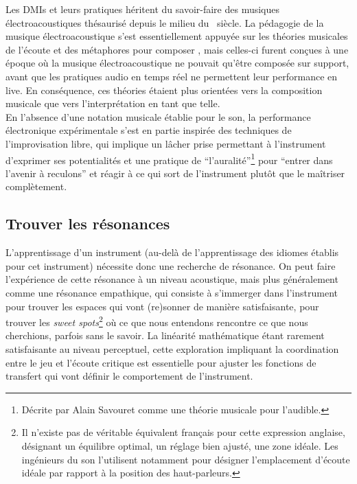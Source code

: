 \noindent Les \glspl{DMI} et leurs pratiques héritent du savoir-faire des musiques électroacoustiques thésaurisé depuis le milieu du ~siècle. La pédagogie de la musique électroacoustique s'est essentiellement appuyée sur les théories musicales de l'écoute \cite{schaeffer_traite_1966} et des métaphores pour composer \cite{bayle_musique_1993}, mais celles-ci furent conçues à une époque où la musique électroacoustique ne pouvait qu'être composée sur support, avant que les pratiques audio en temps réel ne permettent leur performance en live. En conséquence, ces théories étaient plus orientées vers la composition musicale que vers l'interprétation en tant que telle.\\
\indent En l'absence d'une notation musicale établie pour le son, la performance électronique expérimentale s'est en partie inspirée des techniques de l'improvisation libre, qui implique un lâcher prise permettant à l'instrument d'exprimer ses potentialités et une pratique de ``l'auralité''\footnote{Décrite par Alain Savouret comme une théorie musicale pour l'audible.} pour ``entrer dans l'avenir à reculons'' \cite{savouret_introduction_2010} et réagir à ce qui sort de l'instrument plutôt que le maîtriser complètement. 

\subsection{Trouver les résonances}

\noindent L'apprentissage d'un instrument (au-delà de l'apprentissage des idiomes établis pour cet instrument) nécessite donc une recherche de résonance. On peut faire l'expérience de cette résonance à un niveau acoustique, mais plus généralement comme une résonance empathique, qui consiste à s'immerger dans l'instrument pour trouver les espaces qui vont (re)sonner de manière satisfaisante, pour trouver les \textit{sweet spots}\footnote{Il n'existe pas de véritable équivalent français pour cette expression anglaise, désignant un équilibre optimal, un réglage bien ajusté, une zone idéale. Les ingénieurs du son l'utilisent notamment pour désigner l'emplacement d'écoute idéale par rapport à la position des haut-parleurs.} où ce que nous entendons rencontre ce que nous cherchions, parfois sans le savoir. La linéarité mathématique étant rarement satisfaisante au niveau perceptuel, cette exploration impliquant la coordination entre le jeu et l'écoute critique est essentielle pour ajuster les fonctions de transfert qui vont définir le comportement de l'instrument.


